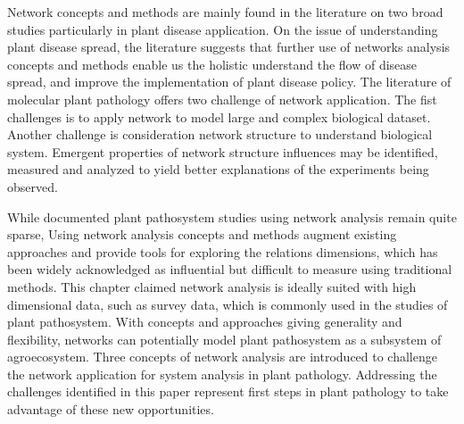 Network concepts and methods are mainly found in the literature on two broad studies particularly in plant disease application. On the issue of understanding plant disease spread, the literature suggests that further use of networks analysis concepts and methods enable us the holistic understand the flow of disease spread, and improve the implementation of plant disease policy. The literature of molecular plant pathology offers two challenge of network application. The fist challenges is to apply network to model large and complex biological dataset. Another challenge is consideration network structure to understand biological system. Emergent properties of network structure influences  may be identified, measured and analyzed to yield better explanations of the experiments being observed.

While documented plant pathosystem studies using network analysis remain quite sparse, Using network analysis concepts and methods augment existing approaches and provide tools for exploring the relations dimensions, which has been widely acknowledged as influential but difficult to measure using traditional methods. This chapter claimed network analysis is ideally suited with high dimensional data, such as survey data, which is commonly used in the studies of plant pathosystem. With concepts and approaches giving generality and flexibility, networks can potentially model plant pathosystem as a subsystem of agroecosystem. Three concepts of network analysis are introduced to challenge the network application for system analysis in plant pathology. Addressing the challenges identified in this paper represent first steps in plant pathology  to take advantage of these new opportunities.

